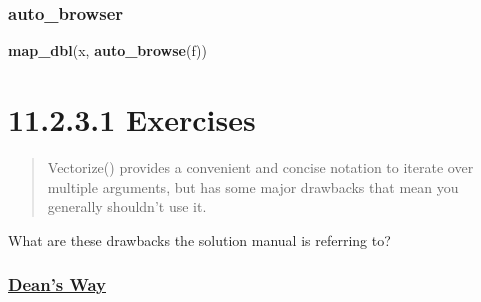 \documentclass[]{book}
\newenvironment{Shaded}{\begin{snugshade}}{\end{snugshade}}
\newcommand{\CommentTok}[1]{\textcolor[rgb]{0.56,0.35,0.01}{\textit{#1}}}
\newcommand{\ControlFlowTok}[1]{\textcolor[rgb]{0.13,0.29,0.53}{\textbf{#1}}}
\newcommand{\DataTypeTok}[1]{\textcolor[rgb]{0.13,0.29,0.53}{#1}}
\newcommand{\DecValTok}[1]{\textcolor[rgb]{0.00,0.00,0.81}{#1}}
\newcommand{\KeywordTok}[1]{\textcolor[rgb]{0.13,0.29,0.53}{\textbf{#1}}}
\newcommand{\NormalTok}[1]{#1}
\newcommand{\OperatorTok}[1]{\textcolor[rgb]{0.81,0.36,0.00}{\textbf{#1}}}
\newcommand{\StringTok}[1]{\textcolor[rgb]{0.31,0.60,0.02}{#1}}
\begin{document}
\hypertarget{auto_browser}{%
\subsubsection*{auto\_browser}\label{auto_browser}}

\begin{Shaded}
\begin{Highlighting}[]
\KeywordTok{map_dbl}\NormalTok{(x, }\KeywordTok{auto_browse}\NormalTok{(f))}
\end{Highlighting}
\end{Shaded}

\hypertarget{exercises-9}{%
\section*{11.2.3.1 Exercises}\label{exercises-9}}

\begin{quote}
Vectorize() provides a convenient and concise notation to iterate over multiple arguments, but has some major drawbacks that mean you generally shouldn't use it.
\end{quote}

What are these drawbacks the solution manual is referring to?

\hypertarget{deans-way}{%
\subsubsection{\texorpdfstring{\href{https://deanattali.com/blog/mutate-non-vectorized/}{Dean's Way}}{Dean's Way}}\label{deans-way}}

\begin{Shaded}
\end{Shaded}
\end{document}
